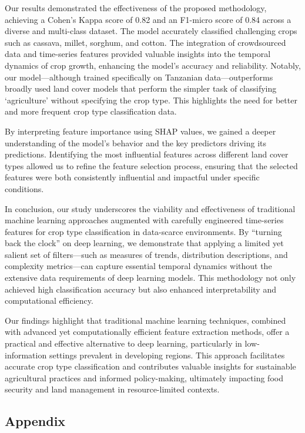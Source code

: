 \documentclass[
  journal,
  twocolumn]{IEEEtran}
\begin{document}
Our results demonstrated the effectiveness of the proposed methodology,
achieving a Cohen's Kappa score of 0.82 and an F1-micro score of 0.84
across a diverse and multi-class dataset. The model accurately
classified challenging crops such as cassava, millet, sorghum, and
cotton. The integration of crowdsourced data and time-series features
provided valuable insights into the temporal dynamics of crop growth,
enhancing the model's accuracy and reliability. Notably, our
model---although trained specifically on Tanzanian data---outperforms
broadly used land cover models that perform the simpler task of
classifying `agriculture' without specifying the crop type. This
highlights the need for better and more frequent crop type
classification data.

By interpreting feature importance using SHAP values, we gained a deeper
understanding of the model's behavior and the key predictors driving its
predictions. Identifying the most influential features across different
land cover types allowed us to refine the feature selection process,
ensuring that the selected features were both consistently influential
and impactful under specific conditions.

In conclusion, our study underscores the viability and effectiveness of
traditional machine learning approaches augmented with carefully
engineered time-series features for crop type classification in
data-scarce environments. By ``turning back the clock'' on deep
learning, we demonstrate that applying a limited yet salient set of
filters---such as measures of trends, distribution descriptions, and
complexity metrics---can capture essential temporal dynamics without the
extensive data requirements of deep learning models. This methodology
not only achieved high classification accuracy but also enhanced
interpretability and computational efficiency.

Our findings highlight that traditional machine learning techniques,
combined with advanced yet computationally efficient feature extraction
methods, offer a practical and effective alternative to deep learning,
particularly in low-information settings prevalent in developing
regions. This approach facilitates accurate crop type classification and
contributes valuable insights for sustainable agricultural practices and
informed policy-making, ultimately impacting food security and land
management in resource-limited contexts.

\newpage

\hypertarget{appendix}{%
\subsection{Appendix}\label{appendix}}
\end{document}
